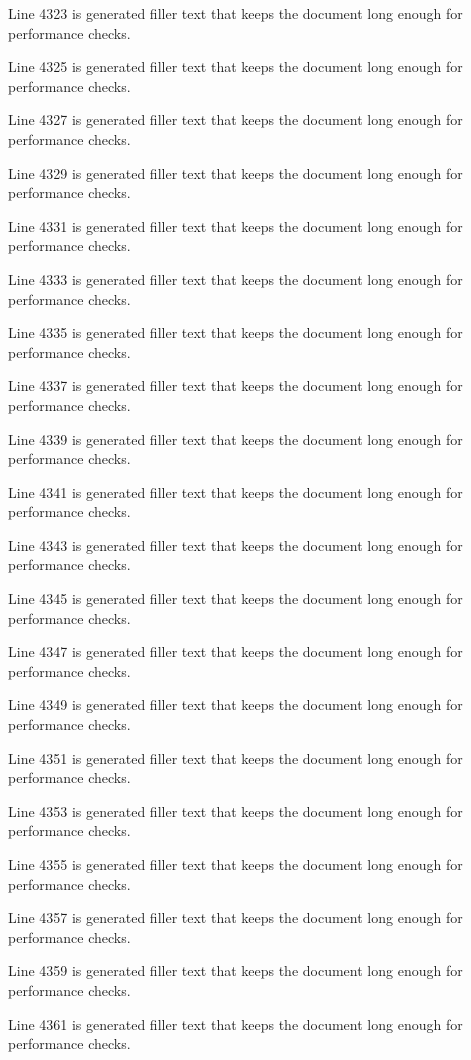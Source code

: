 Line 4323 is generated filler text that keeps the document long enough for performance checks.

Line 4325 is generated filler text that keeps the document long enough for performance checks.

Line 4327 is generated filler text that keeps the document long enough for performance checks.

Line 4329 is generated filler text that keeps the document long enough for performance checks.

Line 4331 is generated filler text that keeps the document long enough for performance checks.

Line 4333 is generated filler text that keeps the document long enough for performance checks.

Line 4335 is generated filler text that keeps the document long enough for performance checks.

Line 4337 is generated filler text that keeps the document long enough for performance checks.

Line 4339 is generated filler text that keeps the document long enough for performance checks.

Line 4341 is generated filler text that keeps the document long enough for performance checks.

Line 4343 is generated filler text that keeps the document long enough for performance checks.

Line 4345 is generated filler text that keeps the document long enough for performance checks.

Line 4347 is generated filler text that keeps the document long enough for performance checks.

Line 4349 is generated filler text that keeps the document long enough for performance checks.

Line 4351 is generated filler text that keeps the document long enough for performance checks.

Line 4353 is generated filler text that keeps the document long enough for performance checks.

Line 4355 is generated filler text that keeps the document long enough for performance checks.

Line 4357 is generated filler text that keeps the document long enough for performance checks.

Line 4359 is generated filler text that keeps the document long enough for performance checks.

Line 4361 is generated filler text that keeps the document long enough for performance checks.

